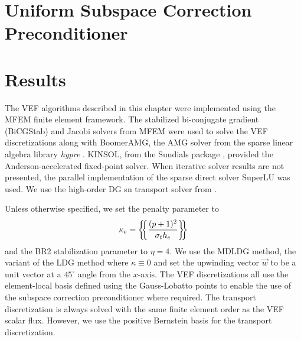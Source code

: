 \documentclass[../doc.tex]{subfiles}
\begin{document}
\section{Uniform Subspace Correction Preconditioner}

\section{Results}
The VEF algorithms described in this chapter were implemented using the MFEM \cite{MFEM,mfem-web} finite element framework. The stabilized bi-conjugate gradient (BiCGStab) and Jacobi solvers from MFEM were used to solve the VEF discretizations along with BoomerAMG, the AMG solver from the sparse linear algebra library \emph{hypre} \cite{hypre}. KINSOL, from the Sundials package \cite{hindmarsh2005sundials}, provided the Anderson-accelerated fixed-point solver. When iterative solver results are not presented, the parallel implementation of the sparse direct solver SuperLU \cite{lidemmel03} was used. We use the high-order DG \gls{sn} transport solver from \cite{graph_sweeps}.

Unless otherwise specified, we set the penalty parameter to 
	\begin{equation}
		\kappa_e = \left\{\!\!\left\{\frac{(p+1)^2}{\sigma_t h_e}\right\}\!\!\right\} 
	\end{equation}
and the BR2 stabilization parameter to $\eta = 4$. We use the MDLDG method, the variant of the LDG method where $\kappa \equiv 0$ and set the upwinding vector $\vec{w}$ to be a unit vector at a $45^\circ$ angle from the $x$-axis. The VEF discretizations all use the element-local basis defined using the Gauss-Lobatto points to enable the use of the subspace correction preconditioner where required. The transport discretization is always solved with the same finite element order as the VEF scalar flux. However, we use the positive Bernstein basis \cite{doi:10.1137/11082539X} for the transport discretization. 
\end{document}
